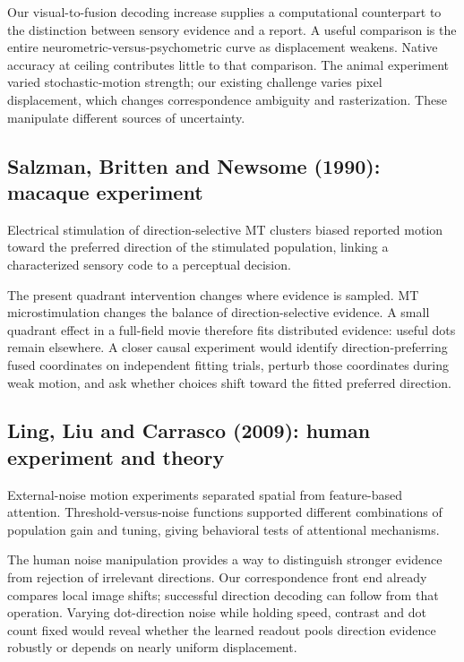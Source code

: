 \documentclass[11pt]{article}
\begin{document}
Our visual-to-fusion decoding increase supplies a computational counterpart to the distinction between sensory evidence and a report. A useful comparison is the entire neurometric-versus-psychometric curve as displacement weakens. Native accuracy at ceiling contributes little to that comparison. The animal experiment varied stochastic-motion strength; our existing challenge varies pixel displacement, which changes correspondence ambiguity and rasterization. These manipulate different sources of uncertainty.

\subsection{Salzman, Britten and Newsome (1990): macaque experiment}
Electrical stimulation of direction-selective MT clusters biased reported motion toward the preferred direction of the stimulated population, linking a characterized sensory code to a perceptual decision. \cite{bio_salzman}

The present quadrant intervention changes where evidence is sampled. MT microstimulation changes the balance of direction-selective evidence. A small quadrant effect in a full-field movie therefore fits distributed evidence: useful dots remain elsewhere. A closer causal experiment would identify direction-preferring fused coordinates on independent fitting trials, perturb those coordinates during weak motion, and ask whether choices shift toward the fitted preferred direction.

\subsection{Ling, Liu and Carrasco (2009): human experiment and theory}
External-noise motion experiments separated spatial from feature-based attention. Threshold-versus-noise functions supported different combinations of population gain and tuning, giving behavioral tests of attentional mechanisms. \cite{bio_ling}

The human noise manipulation provides a way to distinguish stronger evidence from rejection of irrelevant directions. Our correspondence front end already compares local image shifts; successful direction decoding can follow from that operation. Varying dot-direction noise while holding speed, contrast and dot count fixed would reveal whether the learned readout pools direction evidence robustly or depends on nearly uniform displacement.
\end{document}
